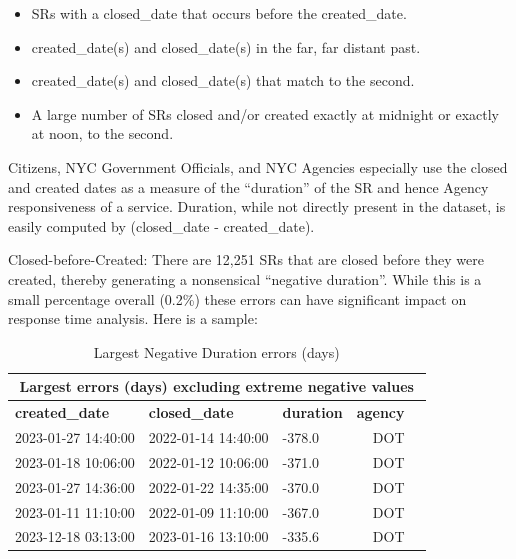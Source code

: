 \documentclass[linenumber]{jdsart}
\begin{document}
	
\begin{itemize}
	\item SRs with a closed\_date that occurs before the created\_date.

 	\item created\_date(s) and closed\_date(s) in the far, far distant past.

 	\item created\_date(s) and closed\_date(s) that match to the second.

	\item A large number of SRs closed and/or created exactly at midnight 
	or exactly at noon, to the second.
\end{itemize}
	
	
Citizens, NYC Government Officials, and NYC Agencies especially use 
the closed and created dates as a measure of the ``duration'' of the SR 
and hence Agency responsiveness of a service. Duration, while 
not directly present in the dataset, is easily 
computed by (closed\_date - created\_date).
	
Closed-before-Created: There are 12,251 SRs that are closed before they 
were created, thereby generating a nonsensical ``negative duration''. 
While this is a small percentage overall (0.2\%) these errors can 
have significant impact on response time analysis. Here is a sample:


\begin{table}[tbp]
    \centering
    \caption{Largest Negative Duration errors (days)}
	    \begin{tabular}{l l l r l}
	        \toprule
	        \multicolumn{5}{c}{\textbf{Largest errors (days) excluding 
	        extreme negative values}} \\
	        \midrule
	        \textbf{created\_date} & \textbf{closed\_date} & \textbf{duration} 
	        & \textbf{agency} \\
		        \midrule
		        2023-01-27 14:40:00 & 2022-01-14 14:40:00 & -378.0 & DOT \\
		        2023-01-18 10:06:00 & 2022-01-12 10:06:00 & -371.0 & DOT \\
		        2023-01-27 14:36:00 & 2022-01-22 14:35:00 & -370.0 & DOT \\
		        2023-01-11 11:10:00 & 2022-01-09 11:10:00 & -367.0 & DOT \\
		        2023-12-18 03:13:00 & 2023-01-16 13:10:00 & -335.6 & DOT \\
		        \bottomrule
	    \end{tabular}
    \label{tab:largest-errors}
\end{table}
\end{document}
